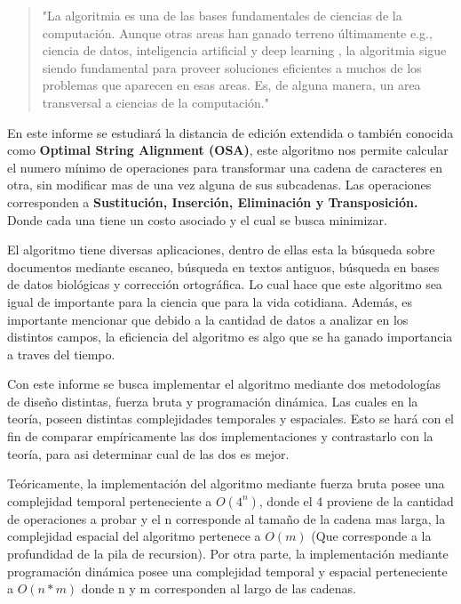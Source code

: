 

\begin{quote}
"La algoritmia es una de las
bases fundamentales de ciencias de la computación. Aunque otras areas
han ganado terreno últimamente e.g., ciencia de datos, inteligencia
artificial y deep learning , la algoritmia sigue siendo fundamental para
proveer soluciones eficientes a muchos de los problemas que aparecen
en esas areas. Es, de alguna manera, un area transversal a ciencias de
la computación."  \cite{algoritmos_discretos}
\end{quote}

En este informe se estudiará la distancia de edición 
extendida o también conocida como
\textbf{Optimal String Alignment (OSA)}, este algoritmo nos permite
calcular el numero mínimo de operaciones para transformar una cadena
de caracteres en otra, sin modificar mas de una vez alguna de sus subcadenas. Las operaciones corresponden a \textbf{Sustitución,
Inserción, Eliminación y Transposición.} Donde cada una tiene un costo
asociado y el cual se busca minimizar.

El algoritmo tiene diversas aplicaciones, dentro de ellas esta
la búsqueda sobre documentos mediante escaneo, búsqueda en textos antiguos,
búsqueda en bases de datos biológicas y corrección ortográfica. Lo cual
hace que este algoritmo sea igual de importante para la ciencia que para
la vida cotidiana. Además, es importante mencionar que debido a la cantidad
de datos a analizar en los distintos campos, la eficiencia del algoritmo
es algo que se ha ganado importancia a traves del tiempo.
\cite{algoritmos_discretos}

Con este informe se busca implementar el algoritmo mediante dos metodologías
de diseño distintas, fuerza bruta y programación dinámica. Las cuales en la
teoría, poseen distintas complejidades temporales y espaciales. Esto se hará
con el fin de comparar empíricamente las dos implementaciones y 
contrastarlo con la teoría, para asi determinar cual de las dos es mejor.

Teóricamente, la implementación del algoritmo mediante fuerza bruta 
posee una complejidad temporal perteneciente a \( O(4^n) \), donde el 4 proviene
de la cantidad de operaciones a probar y el n corresponde al tamaño de la cadena mas larga, la complejidad
espacial del algoritmo pertenece a \( O(m) \) (Que corresponde a la profundidad de la pila
de recursion). Por otra parte, la implementación mediante programación dinámica
posee una complejidad temporal y espacial perteneciente a \( O(n*m) \) donde n y m corresponden
al largo de las cadenas.

